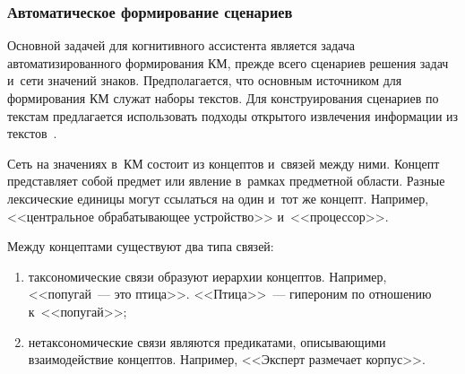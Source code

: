 \begin{multicols}{2}
  \subsubsection{Автоматическое формирование сценариев} %
  
  
   Основной задачей для когнитивного ассистента является задача 
автоматизированного формирования КМ, прежде всего сценариев 
решения задач и~сети значений знаков. Предполагается, что основным 
источником для формирования КМ служат наборы текстов. Для 
конструирования сценариев по текстам предлагается использовать подходы 
открытого извлечения информации из текстов~\cite{6-sm, 7-sm}.

  
  Сеть на значениях в~КМ состоит из концептов и~связей между ними. Концепт 
представляет собой предмет или явление в~рамках предметной области. Разные 
лексические единицы могут ссылаться на один и~тот же концепт. Например, 
<<центральное обрабатывающее устройство>> и~<<процессор>>. 
  
  Между концептами существуют два типа связей:
  \begin{enumerate}[(1)]
\item таксономические связи образуют иерархии концептов. Например, 
<<попугай~--- это птица>>. <<Птица>>~--- гипероним по отношению 
к~<<попугай>>;
\item нетаксономические связи являются предикатами, описывающими 
взаимодействие концептов. Например, <<Эксперт размечает корпус>>.
\end{enumerate}


\end{multicols}
